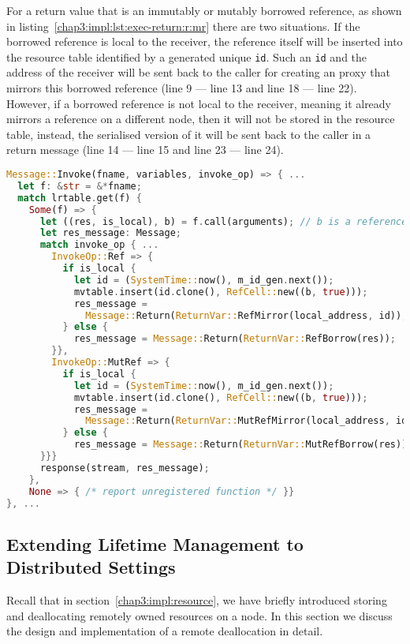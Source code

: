 For a return value that is an immutably or mutably borrowed reference, as shown in listing~\ref{chap3:impl:lst:exec-return:r:mr} there are two situations. 
If the borrowed reference is local to the receiver, the reference itself will be inserted into the resource table identified by a generated unique \texttt{id}. Such an \texttt{id} and the address of the receiver will be sent back to the caller for creating an proxy that mirrors this borrowed reference (line 9 --- line 13 and line 18 --- line 22). 
However, if a borrowed reference is not local to the receiver, meaning it already mirrors a reference on a different node, then it will not be stored in the resource table, instead, the serialised version of it will be sent back to the caller in a return message (line 14 --- line 15 and line 23 --- line 24).
\begin{lstlisting}[language=Rust, style=boxed, basicstyle=\footnotesize\ttfamily, caption={Executing an invocation and returning the result: \texttt{Ref} and \texttt{MutRef}}, label=chap3:impl:lst:exec-return:r:mr]
Message::Invoke(fname, variables, invoke_op) => { ...
  let f: &str = &*fname; 
  match lrtable.get(f) {
    Some(f) => {
      let ((res, is_local), b) = f.call(arguments); // b is a reference
      let res_message: Message;
      match invoke_op { ...
        InvokeOp::Ref => {
          if is_local {
            let id = (SystemTime::now(), m_id_gen.next());
            mvtable.insert(id.clone(), RefCell::new((b, true)));
            res_message =
              Message::Return(ReturnVar::RefMirror(local_address, id));
          } else { 
            res_message = Message::Return(ReturnVar::RefBorrow(res)); 
        }}, 
        InvokeOp::MutRef => {
          if is_local {
            let id = (SystemTime::now(), m_id_gen.next());
            mvtable.insert(id.clone(), RefCell::new((b, true)));
            res_message =
              Message::Return(ReturnVar::MutRefMirror(local_address, id));
          } else { 
            res_message = Message::Return(ReturnVar::MutRefBorrow(res)); 
      }}}
      response(stream, res_message);
    },
    None => { /* report unregistered function */ }}
}, ...
\end{lstlisting}

\subsection{Extending Lifetime Management to Distributed Settings}
\label{chap3:impl:lifetime}
Recall that in section~\ref{chap3:impl:resource}, we have briefly introduced storing and deallocating remotely owned resources on a node. In this section we discuss the design and implementation of a remote deallocation in detail. 

